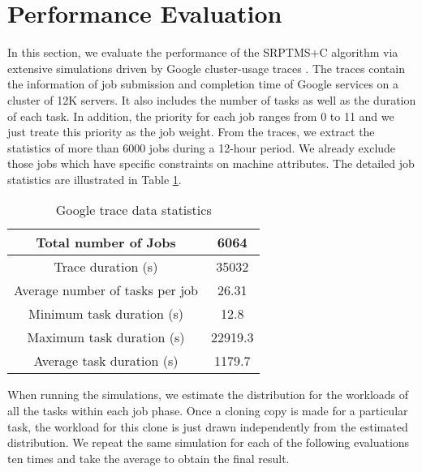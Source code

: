 \documentclass[10pt,conference,compsocconf,letterpaper]{IEEEtran}
\begin{document}
\section{Performance Evaluation}
\label{evaluation}
In this section, we evaluate the performance of the SRPTMS+C algorithm via
extensive simulations driven by Google cluster-usage traces
\cite{Google_trace}. The traces contain the information of job submission and completion time of
Google services on a cluster
of 12K servers. It also includes the number of tasks as well as the duration of each task. In addition, the priority for each job
ranges from 0 to 11 and we just treate this priority as the job weight.
From the traces, we extract the statistics of more than 6000 jobs during a 12-hour period.
 We already exclude those jobs which have specific constraints on machine attributes.
The detailed job statistics are illustrated in Table \ref{table-trace-1}.


\begin{table}
\normalsize
\centering
\caption{Google trace data statistics}
\label{table-trace-1}
\begin{tabular}{|c|c|}
  \hline
Total number of Jobs &  6064\\
  \hline
  Trace duration (s) & 35032\\
  \hline
  Average number of tasks per job & 26.31 \\
  \hline
  Minimum task duration (s) & 12.8 \\
  \hline
  Maximum task duration (s) & 22919.3 \\
  \hline
  Average task duration (s) & 1179.7 \\
  \hline
\end{tabular}
\vspace{-1em}
\end{table}




When running the simulations, we estimate the distribution for the workloads of all the tasks within each job phase. Once a cloning copy is made for a particular task, the workload for this clone is just drawn independently from the estimated distribution. We repeat the same simulation for each of the following evaluations ten times and take the
average to obtain the final result.
\end{document}
